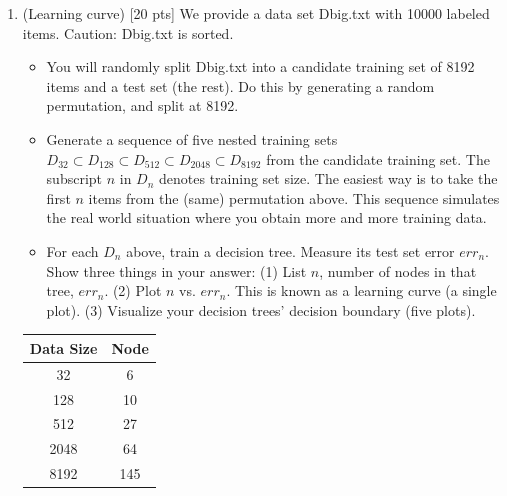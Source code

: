 \documentclass[a4paper]{article}
\theoremstyle{definition}
\newenvironment{soln}{
    \leavevmode\color{blue}\ignorespaces
}{}
\begin{document}
\begin{enumerate}
\item (Learning curve)  [20 pts] We provide a data set Dbig.txt with 10000 labeled items.  Caution: Dbig.txt is sorted.
  \begin{itemize}
  
  \item You will randomly split Dbig.txt into a candidate training set of 8192 items and a test set (the rest).  Do this by generating a random permutation, and split at 8192.
  
  \item Generate a sequence of five nested training sets $D_{32} \subset D_{128} \subset D_{512} \subset D_{2048} \subset D_{8192}$ from the candidate training set.  The subscript $n$ in $D_n$ denotes training set size.  The easiest way is to take the first $n$ items from the (same) permutation above.  This sequence simulates the real world situation where you obtain more and more training data.
  
  \item For each $D_n$ above, train a decision tree.  Measure its test set error $err_n$.  Show three things in your answer: (1) List $n$, number of nodes in that tree, $err_n$. (2) Plot $n$ vs. $err_n$.  This is known as a learning curve (a single plot). (3) Visualize your decision trees' decision boundary (five plots). \\
  \end{itemize}
  
  \begin{soln}
  \begin{center}
      
  \begin{tabular}{|c|c|}
            \hline
            Data Size & Node \\
            \hline
            32 & 6\\
            128 & 10\\
            512 & 27\\
            2048 & 64 \\
            8192 & 145 \\
            \hline
        \end{tabular}\\
  

\end{center}
\end{soln}
\end{enumerate}
\end{document}
